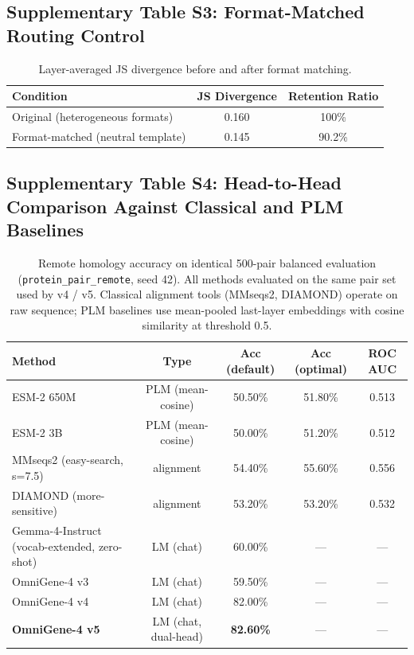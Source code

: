 \documentclass[11pt]{article}
\begin{document}
\subsection{Supplementary Table S3: Format-Matched Routing Control}

\begin{table}[H]
\centering
\caption{Layer-averaged JS divergence before and after format matching.}
\begin{tabular}{lcc}
\toprule
\textbf{Condition} & \textbf{JS Divergence} & \textbf{Retention Ratio} \\
\midrule
Original (heterogeneous formats) & 0.160 & 100\% \\
Format-matched (neutral template) & 0.145 & 90.2\% \\
\bottomrule
\end{tabular}
\end{table}

\subsection{Supplementary Table S4: Head-to-Head Comparison Against Classical and PLM Baselines}

\begin{table}[H]
\centering
\caption{Remote homology accuracy on identical 500-pair balanced evaluation (\texttt{protein\_pair\_remote}, seed 42). All methods evaluated on the same pair set used by v4 / v5. Classical alignment tools (MMseqs2, DIAMOND) operate on raw sequence; PLM baselines use mean-pooled last-layer embeddings with cosine similarity at threshold 0.5.}
\begin{tabular}{lcccc}
\toprule
\textbf{Method} & \textbf{Type} & \textbf{Acc (default)} & \textbf{Acc (optimal)} & \textbf{ROC AUC} \\
\midrule
ESM-2 650M & PLM (mean-cosine) & 50.50\% & 51.80\% & 0.513 \\
ESM-2 3B   & PLM (mean-cosine) & 50.00\% & 51.20\% & 0.512 \\
MMseqs2 (easy-search, s=7.5) & alignment & 54.40\% & 55.60\% & 0.556 \\
DIAMOND (more-sensitive)     & alignment & 53.20\% & 53.20\% & 0.532 \\
Gemma-4-Instruct (vocab-extended, zero-shot) & LM (chat) & 60.00\% & --- & --- \\
\midrule
OmniGene-4 v3 & LM (chat) & 59.50\% & --- & --- \\
OmniGene-4 v4 & LM (chat) & 82.00\% & --- & --- \\
\textbf{OmniGene-4 v5} & LM (chat, dual-head) & \textbf{82.60\%} & --- & --- \\
\bottomrule
\end{tabular}
\end{table}
\end{document}
